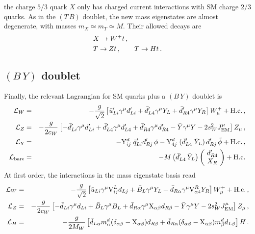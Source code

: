 \documentclass[12pt,a4paper]{article}
\newcommand{\TB}{(T \, B)}
\newcommand{\BY}{(B \, Y)}
\newcommand{\gm}{\gamma^\mu}
\newcommand{\Wmp}{W_\mu^+}
\newcommand{\Zm}{Z_\mu}
\begin{document}
the charge $5/3$ quark $X$ only has charged current interactions with SM charge $2/3$ quarks. 
As in the $\TB$ doublet, the new mass eigenstates are almost degenerate, with masses $m_X \simeq m_T \simeq M$. Their allowed decays are
\begin{align}
& X \to W^+ t \,, \notag \\
& T \to Zt \,,\quad \quad T \to Ht \,. 
\end{align}



\subsection{$\BY$ doublet}
\label{sec:2.5}

Finally, the relevant Lagrangian for SM quarks plus a $\BY$ doublet is
\begin{eqnarray}
\mathcal{L}_W & = & -\frac{g}{\sqrt 2} \left[ \bar u_{Li}' \gm d_{Li}'
 + \bar d_{L4}' \gm Y_L + \bar d_{R4}' \gm Y_R
  \right] \Wmp + \text{H.c.} \,, \notag \\
%
\mathcal{L}_Z & = & -\frac{g}{2 c_W} \left[ - \bar d_{Li}' \gm d_{Li}'
 + \bar d_{L4}' \gm d_{L4}' + \bar d_{R4}' \gm d_{R4}' - \bar Y \gm Y 
- 2 s_W^2 J_\text{EM}^\mu \right] \Zm \,, \notag \\
%
\mathcal{L}_\text{Y} & = &
  - \mathrm{Y}_{ij}^d \; \bar q_{Li}' d_{Rj}' \, \phi
  - \mathrm{Y}_{4j}^d \; (\bar d_{L4}' \; \bar Y_L ) \, d_{Rj}' \, \tilde \phi
+ \text{H.c.} \,, \notag \\
%
\mathcal{L}_\text{bare}  & = & - M \left( \bar d_{L4}' \, \bar Y_L \right)
\left( \! \begin{array}{c} d_{R4}' \\ X_R \end{array} \! \right) + \text{H.c.}
\end{eqnarray}
At first order, the interactions in the mass eigenstate basis read
\begin{eqnarray}
\mathcal{L}_W & = & -\frac{g}{\sqrt 2} \left[
  \bar u_{Li} \gm \mathrm{V}_{ij}^L d_{Lj} + \bar B_L \gm Y_L
  + \bar d_{R\alpha} \gm \mathrm{V}_{\alpha 4}^R Y_R
 \right] \Wmp + \text{H.c.} \,, \notag \\
%
\mathcal{L}_Z & = & -\frac{g}{2 c_W} \left[
-\bar d_{Li} \gm d_{Li} + \bar B_L \gm B_L
+ \bar d_{R\alpha} \gm \mathrm{X}_{\alpha \beta} d_{R\beta} 
- \bar Y \gm Y - 2 s_W^2 J_\text{EM}^\mu \right] \Zm \,, \notag \\
%
\mathcal{L}_H & = & - \frac{g}{2 M_W} \left[
\bar d_{L\alpha} m_\alpha^d (\delta_{\alpha \beta}-\mathrm{X}_{\alpha \beta}) d_{R\beta}
+ \bar d_{R\alpha} (\delta_{\alpha \beta}-\mathrm{X}_{\alpha \beta}) m_\beta^d d_{L\beta}
\right] H \,.
\end{eqnarray}
\end{document}
